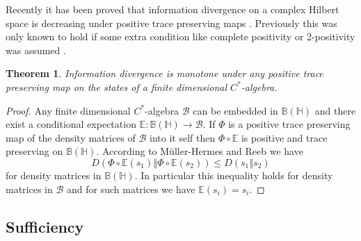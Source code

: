\documentclass[10pt,a4paper,draft]{article}
\newtheorem{thm}{Theorem}
\begin{document}
Recently it has been proved that information divergence on a
complex Hilbert space is decreasing under positive trace preserving maps
\cite{Mueller-Hermes2016,Christandl2016}.
Previously this was only known to hold if some extra condition
like complete positivity or 2-positivity was assumed \cite{Petz2003}.
\begin{thm}
Information divergence is monotone under any positive trace
preserving map on the states of a finite dimensional $C^{*}$-algebra.
\end{thm}
\begin{proof}
Any finite dimensional $C^{*}$-algebra $\mathcal{B}$ can be
embedded in $\mathbb{B}\left(\mathbb{H}\right)$
and there exist a conditional expectation
$\mathbb{E}:\mathbb{B}\left(\mathbb{H}\right)\to\mathcal{B}.$
If $\Phi$ is a positive trace preserving map of the density
matrices of $\mathcal{B}$ into it self then $\Phi\circ\mathbb{E}$ is
positive and trace preserving on $\mathbb{B}\left(\mathbb{H}\right).$
According to M{\"u}ller-Hermes and Reeb \cite{Mueller-Hermes2016} we have\[
D\left(\left.\Phi\circ\mathbb{E}\left(s_{1}\right)\right\Vert
\Phi\circ\mathbb{E}\left(s_{2}\right)\right)\leq
D\left(\left.s_{1}\right\Vert
s_{2}\right)
\]
for density matrices in $\mathbb{B}\left(\mathbb{H}\right).$ In
particular this inequality holds for density matrices in $\mathcal{B}$ and for such
matrices we have $\mathbb{E}\left(s_{i}\right)=s_{i}$.
\end{proof}

\subsection{Sufficiency}
\end{document}
